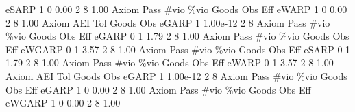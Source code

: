        eSARP {\VBAR}    1           0        0.00           2           8        1.00  
{\smallskip}
{\smallskip}
{\smallskip}
       Axiom {\VBAR} Pass        \#vio        \%vio       Goods         Obs         Eff  
       eWARP {\VBAR}    1           0        0.00           2           8        1.00  
{\smallskip}
       Axiom {\VBAR}       AEI        Tol      Goods        Obs 
       eGARP {\VBAR}         1   1.00e-12          2          8 
{\smallskip}
{\smallskip}
{\smallskip}
       Axiom {\VBAR} Pass        \#vio        \%vio       Goods         Obs         Eff  
       eGARP {\VBAR}    0           1        1.79           2           8        1.00  
{\smallskip}
{\smallskip}
{\smallskip}
       Axiom {\VBAR} Pass        \#vio        \%vio       Goods         Obs         Eff  
      eWGARP {\VBAR}    0           1        3.57           2           8        1.00  
{\smallskip}
{\smallskip}
{\smallskip}
       Axiom {\VBAR} Pass        \#vio        \%vio       Goods         Obs         Eff  
       eSARP {\VBAR}    0           1        1.79           2           8        1.00  
{\smallskip}
{\smallskip}
{\smallskip}
       Axiom {\VBAR} Pass        \#vio        \%vio       Goods         Obs         Eff  
       eWARP {\VBAR}    0           1        3.57           2           8        1.00  
{\smallskip}
       Axiom {\VBAR}       AEI        Tol      Goods        Obs 
       eGARP {\VBAR}         1   1.00e-12          2          8 
{\smallskip}
{\smallskip}
{\smallskip}
       Axiom {\VBAR} Pass        \#vio        \%vio       Goods         Obs         Eff  
       eGARP {\VBAR}    1           0        0.00           2           8        1.00  
{\smallskip}
{\smallskip}
{\smallskip}
       Axiom {\VBAR} Pass        \#vio        \%vio       Goods         Obs         Eff  
      eWGARP {\VBAR}    1           0        0.00           2           8        1.00  
{\smallskip}
{\smallskip}
{\smallskip}
